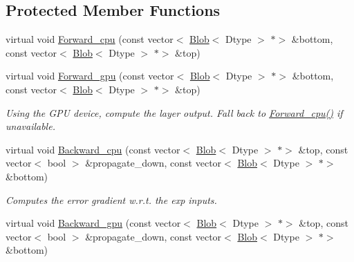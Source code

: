 \subsection*{Protected Member Functions}
\begin{DoxyCompactItemize}
\item 
virtual void \mbox{\hyperlink{classcaffe_1_1_exp_layer_af623edf2518145ad490baebdda9efe92}{Forward\+\_\+cpu}} (const vector$<$ \mbox{\hyperlink{classcaffe_1_1_blob}{Blob}}$<$ Dtype $>$ $\ast$$>$ \&bottom, const vector$<$ \mbox{\hyperlink{classcaffe_1_1_blob}{Blob}}$<$ Dtype $>$ $\ast$$>$ \&top)
\item 
\mbox{\label{classcaffe_1_1_exp_layer_a5e4d78781ca2c27bce9c45601ffdb2ca}} 
virtual void \mbox{\hyperlink{classcaffe_1_1_exp_layer_a5e4d78781ca2c27bce9c45601ffdb2ca}{Forward\+\_\+gpu}} (const vector$<$ \mbox{\hyperlink{classcaffe_1_1_blob}{Blob}}$<$ Dtype $>$ $\ast$$>$ \&bottom, const vector$<$ \mbox{\hyperlink{classcaffe_1_1_blob}{Blob}}$<$ Dtype $>$ $\ast$$>$ \&top)
\begin{DoxyCompactList}\small\item\em Using the G\+PU device, compute the layer output. Fall back to \mbox{\hyperlink{classcaffe_1_1_exp_layer_af623edf2518145ad490baebdda9efe92}{Forward\+\_\+cpu()}} if unavailable. \end{DoxyCompactList}\item 
virtual void \mbox{\hyperlink{classcaffe_1_1_exp_layer_a3629dc4ebe692252f28edc204b8bf435}{Backward\+\_\+cpu}} (const vector$<$ \mbox{\hyperlink{classcaffe_1_1_blob}{Blob}}$<$ Dtype $>$ $\ast$$>$ \&top, const vector$<$ bool $>$ \&propagate\+\_\+down, const vector$<$ \mbox{\hyperlink{classcaffe_1_1_blob}{Blob}}$<$ Dtype $>$ $\ast$$>$ \&bottom)
\begin{DoxyCompactList}\small\item\em Computes the error gradient w.\+r.\+t. the exp inputs. \end{DoxyCompactList}\item 
\mbox{\label{classcaffe_1_1_exp_layer_aa5c6dde86812f0103ab153293c0f68b0}} 
virtual void \mbox{\hyperlink{classcaffe_1_1_exp_layer_aa5c6dde86812f0103ab153293c0f68b0}{Backward\+\_\+gpu}} (const vector$<$ \mbox{\hyperlink{classcaffe_1_1_blob}{Blob}}$<$ Dtype $>$ $\ast$$>$ \&top, const vector$<$ bool $>$ \&propagate\+\_\+down, const vector$<$ \mbox{\hyperlink{classcaffe_1_1_blob}{Blob}}$<$ Dtype $>$ $\ast$$>$ \&bottom)

\end{DoxyCompactItemize}
